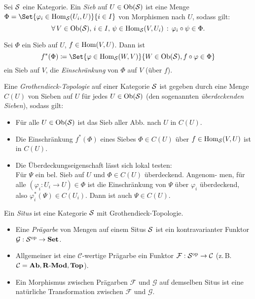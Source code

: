\documentclass{cheat-sheet}
\newcommand{\Fais}{\mathcal{F}} %
\newcommand{\Garb}{\mathcal{G}} %
\begin{document}
\begin{defn}
  Sei $\mathcal{S}$ eine Kategorie. Ein \emph{Sieb} auf $U \in \operatorname{Ob}(\mathcal{S})$ ist eine Menge $\Phi = \Set{\varphi_i \in \Hom_\Sit(U_i, U)}{i \in I}$ von Morphismen nach $U$, sodass gilt:
  \[ \forall \, {V \in \operatorname{Ob}(\mathcal{S}), \, i \in I, \, \psi \in \operatorname{Hom}_{\mathcal{S}}(V, U_i)} \,:\, \varphi_i \circ \psi \in \Phi. \]
\end{defn}

\begin{bem}
  Sei $\Phi$ ein Sieb auf $U$, $f \in \operatorname{Hom}(V, U)$. Dann ist
  \[ f^*(\Phi) \coloneqq \Set{\varphi \in \Hom_\Sit(W, V)}{W \in \Ob(\Sit), f \circ \varphi \in \Phi} \]
  ein Sieb auf $V$, die \emph{Einschränkung} von $\Phi$ auf $V$ (über $f$).
\end{bem}

\begin{defn}
  Eine \emph{Grothendieck-Topologie} auf einer Kategorie $\mathcal{S}$ ist gegeben durch eine Menge $C(U)$ von Sieben auf $U$ für jedes $U \in \operatorname{Ob}(\mathcal{S})$ (den sogenannten \emph{überdeckenden Sieben}), sodass gilt:
  \begin{itemize}
    \item Für alle $U \in \operatorname{Ob}(\mathcal{S})$ ist das Sieb aller Abb. nach $U$ in $C(U)$.
    \item Die Einschränkung $f^*(\Phi)$ eines Siebes $\Phi \in C(U)$ über $f \in \operatorname{Hom}_{\mathcal{S}}(V, U)$ ist in $C(U)$.
    \item Die Überdeckungseigenschaft lässt sich lokal testen: \\
    Für $\Psi$ ein bel. Sieb auf $U$ und $\Phi \in C(U)$ überdeckend. Angenom- men, für alle $(\varphi_i : U_i \to U) \in \Phi$ ist die Einschränkung von $\Psi$ über $\varphi_i$ überdeckend, also $\varphi_i^*(\Psi) \in C(U_i)$. Dann ist auch $\Psi \in C(U)$.
  \end{itemize}
\end{defn}


\begin{defn}
  Ein \emph{Situs} ist eine Kategorie $\mathcal{S}$ mit Grothendieck-Topologie.
\end{defn}

\begin{defn}
  \begin{itemize}
    \item Eine \emph{Prägarbe} von Mengen auf einem Situs $\mathcal{S}$ ist ein kontravarianter Funktor $\Garb : \Sit^\op \to \SetC$.
    \item Allgemeiner ist eine $\mathcal{C}$-wertige Prägarbe ein Funktor $\Fais : \Sit^\op \to \Cat$ (z.\,B. $\mathcal{C} = \mathbf{Ab}, \mathbf{R\text{-}Mod}, \mathbf{Top}$).
    \item Ein Morphismus zwischen Prägarben $\Fais$ und $\Garb$ auf demselben Situs ist eine natürliche Transformation zwischen $\Fais$ und $\Garb$.
  \end{itemize}
\end{defn}
\end{document}
